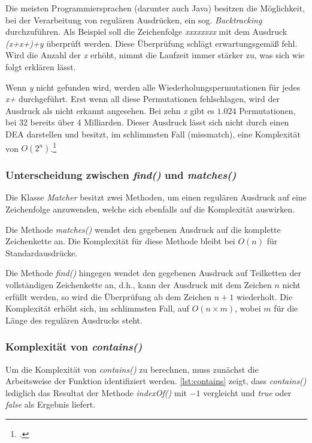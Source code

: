 Die meisten Programmiersprachen (darunter auch Java) besitzen die Möglichkeit, bei der Verarbeitung von regulären Ausdrücken, ein sog. \textit{Backtracking} durchzuführen. Als Beispiel soll die Zeichenfolge \textit{xxxxxxxx} mit dem Ausdruck \textit{(x+x+)+y} überprüft werden. Diese Überprüfung schlägt erwartungsgemäß fehl. Wird die Anzahl der \textit{x} erhöht, nimmt die Laufzeit immer stärker zu, was sich wie folgt erklären lässt.

Wenn \textit{y} nicht gefunden wird, werden alle Wiederholungspermutationen für jedes \textit{x+} durchgeführt. Erst wenn all diese Permutationen fehlschlagen, wird der Ausdruck als nicht erkannt angesehen. Bei zehn \textit{x} gibt es $1.024$ Permutationen, bei 32 bereits über 4 Milliarden. Dieser Ausdruck lässt sich nicht durch einen \acs{DEA} darstellen und besitzt, im schlimmsten Fall (missmatch), eine Komplexität von $O(2^n)$.\footcite[Vgl.][S. 80]{Goyvaerts.2010}


\subsubsection{Unterscheidung zwischen \textit{find()} und \textit{matches()}}
Die Klasse \textit{Matcher} besitzt zwei Methoden, um einen regulären Ausdruck auf eine Zeichenfolge anzuwenden, welche sich ebenfalls auf die Komplexität auswirken.

Die Methode \textit{matches()} wendet den gegebenen Ausdruck auf die komplette Zeichenkette an. Die Komplexität für diese Methode bleibt bei $O(n)$ für Standardausdrücke.

Die Methode \textit{find()} hingegen wendet den gegebenen Ausdruck auf Teilketten der vollständigen Zeichenkette an, d.h., kann der Ausdruck mit dem Zeichen $n$ nicht erfüllt werden, so wird die Überprüfung ab dem Zeichen $n+1$ wiederholt. Die Komplexität erhöht sich, im schlimmsten Fall, auf $O(n \times m)$, wobei $m$ für die Länge des regulären Ausdrucks steht.

\subsubsection{Komplexität von \textit{contains()}}
Um die Komplexität von \textit{contains()} zu berechnen, muss zunächst die Arbeitsweise der Funktion identifiziert werden. \autoref{lst:contains} zeigt, dass \textit{contains()} lediglich das Resultat der Methode \textit{indexOf()} mit $-1$ vergleicht und \textit{true} oder \textit{false} als Ergebnis liefert. \\

